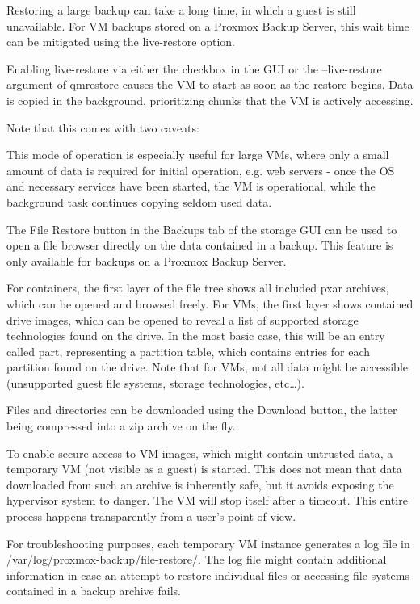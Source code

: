 Restoring a large backup can take a long time, in which a guest is still unavailable. For VM backups stored on a Proxmox Backup Server, this wait time can be mitigated using the live-restore option.

Enabling live-restore via either the checkbox in the GUI or the --live-restore argument of qmrestore causes the VM to start as soon as the restore begins. Data is copied in the background, prioritizing chunks that the VM is actively accessing.

Note that this comes with two caveats:

This mode of operation is especially useful for large VMs, where only a small amount of data is required for initial operation, e.g. web servers - once the OS and necessary services have been started, the VM is operational, while the background task continues copying seldom used data.

The File Restore button in the Backups tab of the storage GUI can be used to open a file browser directly on the data contained in a backup. This feature is only available for backups on a Proxmox Backup Server.

For containers, the first layer of the file tree shows all included pxar archives, which can be opened and browsed freely. For VMs, the first layer shows contained drive images, which can be opened to reveal a list of supported storage technologies found on the drive. In the most basic case, this will be an entry called part, representing a partition table, which contains entries for each partition found on the drive. Note that for VMs, not all data might be accessible (unsupported guest file systems, storage technologies, etc…).

Files and directories can be downloaded using the Download button, the latter being compressed into a zip archive on the fly.

To enable secure access to VM images, which might contain untrusted data, a temporary VM (not visible as a guest) is started. This does not mean that data downloaded from such an archive is inherently safe, but it avoids exposing the hypervisor system to danger. The VM will stop itself after a timeout. This entire process happens transparently from a user’s point of view.

For troubleshooting purposes, each temporary VM instance generates a log file in /var/log/proxmox-backup/file-restore/. The log file might contain additional information in case an attempt to restore individual files or accessing file systems contained in a backup archive fails.


